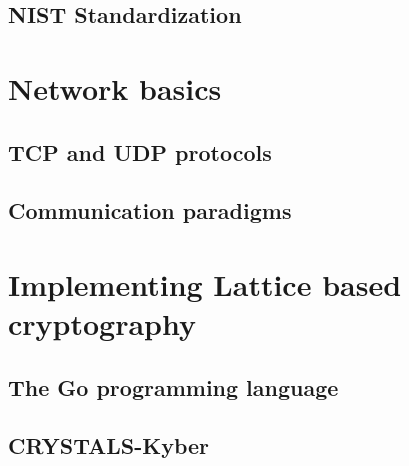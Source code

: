 % 

% 

\section{NIST Standardization}
\label{sec:nist}


\chapter{Network basics}
\label{ch:network_baics}


\section{TCP and UDP protocols}
\label{sec:tcp_and_udp}


\section{Communication paradigms}
\label{sec:comm_paradigms}


\chapter{Implementing Lattice based cryptography}
\label{ch:implementations}


\section{The Go programming language}
\label{sec:go_lang}


\section{CRYSTALS-Kyber}
\label{sec:kyber}


